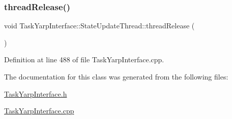\subsubsection{\texorpdfstring{thread\+Release()}{threadRelease()}}
{\footnotesize\ttfamily void Task\+Yarp\+Interface\+::\+State\+Update\+Thread\+::thread\+Release (\begin{DoxyParamCaption}{ }\end{DoxyParamCaption})}



Definition at line 488 of file Task\+Yarp\+Interface.\+cpp.



The documentation for this class was generated from the following files\+:\begin{DoxyCompactItemize}
\item 
\hyperlink{TaskYarpInterface_8h}{Task\+Yarp\+Interface.\+h}\item 
\hyperlink{TaskYarpInterface_8cpp}{Task\+Yarp\+Interface.\+cpp}\end{DoxyCompactItemize}
